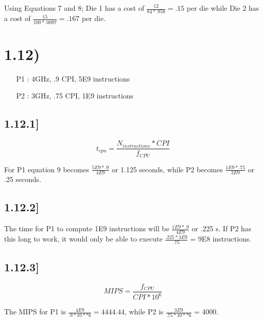 \documentclass[a4paper,11pt]{article}
\begin{document}
Using Equations 7 and 8; Die 1 has a cost of $\frac{12}{84 * .958} = .15$ per die while Die 2 has a cost of $\frac{15}{100 * .0087} = .167$ per die.


\section*{1.12)}

\begin{enumerate}
  \item [P1]: 4GHz, .9 CPI, 5E9 instructions
  \item [P2]: 3GHz, .75 CPI, 1E9 instructions
\end{enumerate}

\subsection*{1.12.1]}

\begin{equation}
t_{cpu} = \frac{N_{instructions} * CPI}{f_{CPU}}
\end{equation}

For P1 equation 9 becomes $\frac{5E9 * .9}{4E9}$ or  1.125 seconds, while P2 becomes $\frac{1E9 * .75}{3E9}$ or .25 seconds.

\subsection*{1.12.2]}

The time for P1 to compute 1E9 instructions will be $\frac{1E9 * .9}{4E9}$ or .225 s.  If P2 has this long to work, it would only be able to execute $\frac{.225 * 3E9}{.75}$ = 9E8 instructions.  


\subsection*{1.12.3]}
\begin{equation}
MIPS = \frac{f_{CPU}}{CPI * 10^{6}}
\end{equation}

The MIPS for P1 is $\frac{4E9}{.9 * 10**{6}} = 4444.44$, while P2 is $\frac{3E9}{.75*10**6}$ = 4000.
\end{document}
